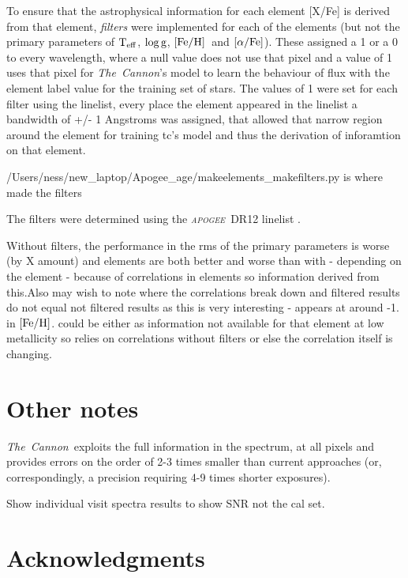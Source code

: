 \documentclass[12pt, preprint]{aastex}
\newcommand{\project}[1]{\textsl{#1}}
\newcommand{\tc}{\project{The~Cannon}}
\newcommand{\apogee}{\project{\textsc{apogee}}}
\newcommand{\aspcap}{\project{\textsc{aspcap}}}
\newcommand{\teff}{\mbox{$\rm T_{eff}$}}
\newcommand{\feh}{\mbox{$\rm [Fe/H]$}}
\newcommand{\alphafe}{\mbox{$\rm [\alpha/Fe]$}}
\newcommand{\logg}{\mbox{$\rm \log g$}}
\begin{document}
To ensure that the astrophysical information for each element [X/Fe] is derived from that element, \textit{filters} were implemented for each of the elements 
(but not the primary parameters of \teff, \logg, \feh\ and \alphafe). These assigned a 1 or a 0 to every wavelength, where a null value does not use that pixel and a value of 1 uses that pixel for \tc's model to learn the behaviour of flux with the element label value for the training set of stars. The values of 1 were set for each filter using the linelist, every place the element appeared in the linelist a bandwidth of +/- 1 Angstroms was assigned, that allowed that narrow region around the element for training tc's model and thus the derivation of inforamtion on that element. 

/Users/ness/new_laptop/Apogee_age/makeelements_makefilters.py is where made the filters 

The filters were determined using the \apogee\ DR12 linelist \citep{Shetrone2015}. 

Without filters, the performance in the rms of the primary parameters is worse (by X amount) and elements are both better and worse than with - depending on the element - because of correlations in elements so information derived from this.Also may wish to note where the correlations break down and filtered results do not equal not filtered results as this is very interesting - appears at around -1. in \feh. could be either as information not available for that element at low metallicity so relies on correlations without filters or else the correlation itself is changing.   

\section{Other notes} 

\tc\ exploits the full information in the spectrum, at all pixels and provides errors on the order of 2-3 times smaller than current approaches (or, correspondingly, a precision requiring 4-9 times shorter exposures). %

Show individual visit spectra results to show SNR not the cal set. \\




\section*{Acknowledgments}
\end{document}
